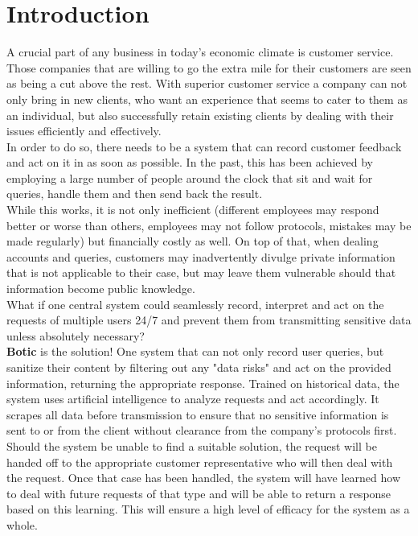 \documentclass[11pt]{article}
\begin{document}
\section{Introduction}
\begin{flushleft}
A crucial part of any business in today's economic climate is customer service. Those companies that are willing to go the extra mile for their customers are seen as being a cut above the rest. With superior customer service a company can not only bring in new clients, who want an experience that seems to cater to them as an individual, but also successfully retain existing clients by dealing with their issues efficiently and effectively.\\[0.5cm]

In order to do so, there needs to be a system that can record customer feedback and act on it in as soon as possible. In the past, this has been achieved by employing a large number of people around the clock that sit and wait for queries, handle them and then send back the result.\\[0.5cm]

While this works, it is not only inefficient (different employees may respond better or worse than others, employees may not follow protocols, mistakes may be made regularly) but financially costly as well. On top of that, when dealing accounts and queries, customers may inadvertently divulge private information that is not applicable to their case, but may leave them vulnerable should that information become public knowledge.\\[0.5cm]

What if one central system could seamlessly record, interpret and act on the requests of multiple users 24/7 and prevent them from transmitting sensitive data unless absolutely necessary?\\[0.5cm]

\textbf{Botic} is the solution! One system that can not only record user queries, but sanitize their content by filtering out any "data risks" and act on the provided information, returning the appropriate response. Trained on historical data, the system uses artificial intelligence to analyze requests and act accordingly. It scrapes all data before transmission to ensure that no sensitive information is sent to or from the client without clearance from the company's protocols first.\\[0.5cm]

Should the system be unable to find a suitable solution, the request will be handed off to the appropriate customer representative who will then deal with the request. Once that case has been handled, the system will have learned how to deal with future requests of that type and will be able to return a response based on this learning. This will ensure a high level of efficacy for the system as a whole.\\[0.5cm]


\end{flushleft}
\end{document}
